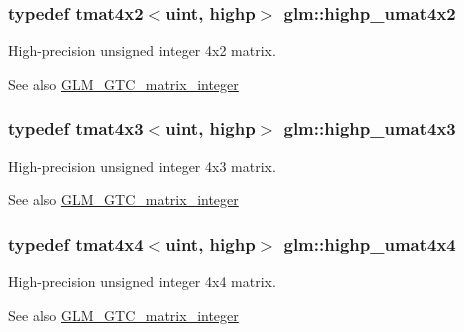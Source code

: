 \subsubsection[{highp\+\_\+umat4x2}]{\setlength{\rightskip}{0pt plus 5cm}typedef tmat4x2$<${\bf uint}, highp$>$ {\bf glm\+::highp\+\_\+umat4x2}}\label{group__gtc__matrix__integer_ga4015bf99a981bf271fd516f9b2cb6724}
High-\/precision unsigned integer 4x2 matrix. \begin{DoxySeeAlso}{See also}
\hyperlink{group__gtc__matrix__integer}{G\+L\+M\+\_\+\+G\+T\+C\+\_\+matrix\+\_\+integer} 
\end{DoxySeeAlso}
\hypertarget{group__gtc__matrix__integer_gaa394320db559302e18c8b64013b8d7fb}{}
\subsubsection[{highp\+\_\+umat4x3}]{\setlength{\rightskip}{0pt plus 5cm}typedef tmat4x3$<${\bf uint}, highp$>$ {\bf glm\+::highp\+\_\+umat4x3}}\label{group__gtc__matrix__integer_gaa394320db559302e18c8b64013b8d7fb}
High-\/precision unsigned integer 4x3 matrix. \begin{DoxySeeAlso}{See also}
\hyperlink{group__gtc__matrix__integer}{G\+L\+M\+\_\+\+G\+T\+C\+\_\+matrix\+\_\+integer} 
\end{DoxySeeAlso}
\hypertarget{group__gtc__matrix__integer_gaf5365128f6fd506442843fb5a441f385}{}
\subsubsection[{highp\+\_\+umat4x4}]{\setlength{\rightskip}{0pt plus 5cm}typedef tmat4x4$<${\bf uint}, highp$>$ {\bf glm\+::highp\+\_\+umat4x4}}\label{group__gtc__matrix__integer_gaf5365128f6fd506442843fb5a441f385}
High-\/precision unsigned integer 4x4 matrix. \begin{DoxySeeAlso}{See also}
\hyperlink{group__gtc__matrix__integer}{G\+L\+M\+\_\+\+G\+T\+C\+\_\+matrix\+\_\+integer} 
\end{DoxySeeAlso}
\hypertarget{group__gtc__matrix__integer_ga77a581b3366fb63fc72f8f20830003e0}{}
